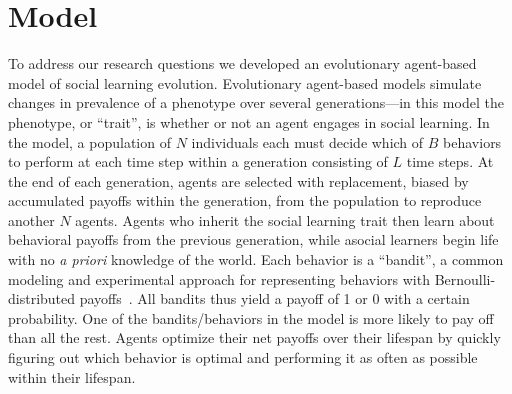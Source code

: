 \documentclass[letterpaper,11.5pt]{scrartcl}
\newcommand{\cm}[1]{{\textcolor{mypurple} {({\tiny CM:} #1)}}}
\begin{document}
\section{Model}


To address our research questions we developed an evolutionary agent-based model of
social learning evolution.  Evolutionary agent-based models simulate changes in
prevalence of a phenotype over several generations---in this model the phenotype, or
``trait'', is whether or not an agent engages in social learning.  In the model, a
population of $N$ individuals each must decide which of $B$ behaviors to perform at
each time step within a generation consisting of $L$ time steps. At the end of each
generation, agents are selected with replacement, biased by accumulated payoffs
within the generation, from the population to reproduce another $N$ agents. Agents
who inherit the social learning trait then learn about behavioral payoffs from the
previous generation, while asocial learners begin life with no \emph{a priori}
knowledge of the world.  Each behavior is a ``bandit'', a common modeling and
experimental approach for representing behaviors with Bernoulli-distributed
payoffs~\cite{SuttonBartoBook,McElreath2005,Steyvers2009,Rendell2010,Schulz2019}.
All bandits thus yield a payoff of 1 or 0 with a certain probability.  One of the
bandits/behaviors in the model is more likely to pay off than all the rest.  Agents
optimize their net payoffs over their lifespan by quickly figuring out which
behavior is optimal and performing it as often as possible within their lifespan.
\end{document}
